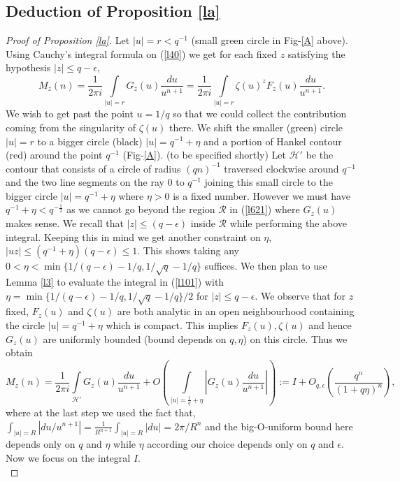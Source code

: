 \documentclass[12pt]{amsart}
\numberwithin{equation}{section}
\theoremstyle{remark}
\theoremstyle{remark}
\theoremstyle{definition}
\begin{document}
\subsection{Deduction of Proposition \ref{la}}
\begin{proof}[Proof of Proposition \ref{la}]
Let $|u|=r < q^{-1}$ (small green circle in Fig-\ref{A} above). Using Cauchy's integral formula on (\ref{l40}) we get for each fixed $z$ satisfying the hypothesis $|z|\leqslant q-\epsilon$,
\begin{equation}\label{l101}
M_z(n)=\dfrac{1}{2\pi i}\displaystyle\int\limits_{|u|=r}G_z(u) \dfrac{du}{u^{n+1}}=\dfrac{1}{2\pi i}\displaystyle\int\limits_{|u|=r}\zeta(u)^zF_z(u) \dfrac{du}{u^{n+1}}.
\end{equation}
We wish to get past the point $u=1/q$ so that we could collect the contribution coming from the singularity of $\zeta(u)$ there. We shift the smaller (green) circle $|u|=r$ to a bigger circle (black) $|u|=q^{-1}+\eta$ and a portion of Hankel contour (red) around the point $q^{-1}$ (Fig-\ref{A}). (to be specified shortly) Let $\mathcal{H}'$ be the contour that consists of a circle of radius $(qn)^{-1}$ traversed clockwise around $q^{-1}$ and the two line segments on the ray $0$ to $q^{-1}$ joining this small circle to the bigger circle $|u|=q^{-1}+\eta$ where $\eta>0$ is a fixed number. However we must have $q^{-1}+\eta <q^{-\frac 12}$ as we cannot go beyond the region $\mathcal{R}$ in (\ref{l621}) where $G_z(u)$ makes sense. We recall that $|z|\leqslant (q-\epsilon)$ inside $\mathcal{R}$ while performing the above integral. Keeping this in mind we get another constraint on $\eta$, $|uz|\leqslant (q^{-1}+\eta)(q-\epsilon)\leqslant 1$. This shows taking any $0<\eta<\min\{1/(q-\epsilon)-1/q,1/\sqrt{q}-1/q \}$ suffices. We then plan to use Lemma \ref{l3} to evaluate the integral in (\ref{l101}) with $\eta=\min\{1/(q-\epsilon)-1/q,1/\sqrt{q}-1/q \}/2$ for $|z|\leqslant q-\epsilon.$ We observe that for $z$ fixed, $F_z(u)$ and $\zeta(u)$ are both analytic in an open neighbourhood containing the circle $|u|=q^{-1}+\eta$ which is compact. This implies $F_z(u),\zeta(u)$ and hence $G_z(u)$ are uniformly bounded (bound depends on $q,\eta$) on this circle. Thus we obtain
$$M_z(n)=\dfrac{1}{2\pi i}\displaystyle\int\limits_{\mathcal{H}'} G_z(u) \dfrac{du}{u^{n+1}} +O\left( \displaystyle\int\limits_{|u|=\frac{1}{q}+\eta} \left| G_z(u) \dfrac{du}{u^{n+1}}\right|\right):=I+ O_{q,\epsilon}\left( \dfrac{q^n}{(1+q\eta)^n}\right),$$
where at the last step we used the fact that, $\int_{|u|=R}|du/u^{n+1}|= \frac{1}{R^{n+1}}\int_{|u|=R}|du|=2\pi/R^{n}$ and the big-O-uniform bound here depends only on $q$ and $\eta$ while $\eta$ according our choice depends only on $q$ and $\epsilon$.  Now we focus on the integral $I$.\\

\end{proof}
\end{document}
